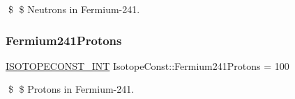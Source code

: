 \$ \$ Neutrons in Fermium-\/241. \mbox{\label{group___isotope_const-_fermium-_fm241_gaac1be3250a516f3c328f0ba0f34a39ef}} 
\subsubsection{\texorpdfstring{Fermium241\+Protons}{Fermium241Protons}}
{\footnotesize\ttfamily \mbox{\hyperlink{group___isotope_const-_macros_ga5f18360b3e99483a35c32d789e62621c}{I\+S\+O\+T\+O\+P\+E\+C\+O\+N\+S\+T\+\_\+\+I\+NT}} Isotope\+Const\+::\+Fermium241\+Protons = 100}

\$ \$ Protons in Fermium-\/241. 